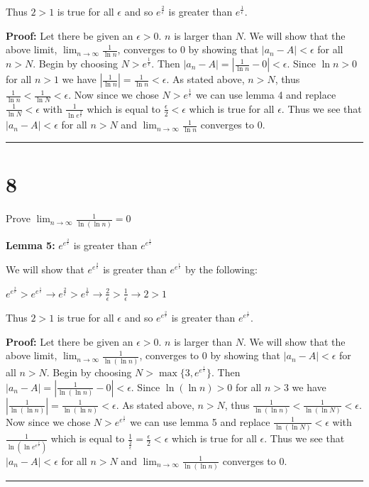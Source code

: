 \documentclass[12pt]{article}
\newcommand{\imp}{\rightarrow}
\newcommand\qedsym{\hfill \rule{2mm}{2mm}}
\begin{document}
Thus $2 > 1$ is true for all $\epsilon$ and so $e^{\frac{2}{\epsilon}}$ is greater than $e^{\frac{1}{\epsilon}}$.

\bigskip

\textbf{Proof:} Let there be given an $\epsilon > 0$. $n$ is larger than $N$. We will show that the above limit, $\lim_{n\to \infty}\frac{1}{\ln n}$, converges to $0$ by showing that $|a_n - A| < \epsilon$ for all $n > N$. Begin by choosing $N > e^{\frac{1}{\epsilon}}$. Then $|a_n - A| = | \frac{1}{\ln n} - 0 | < \epsilon$. Since $\ln n > 0$ for all $n > 1$ we have $|\frac{1}{\ln n}| = \frac{1}{\ln n} < \epsilon$. As stated above, $n > N$, thus $\frac{1}{\ln n} < \frac{1}{\ln N} < \epsilon$. Now since we chose $N > e^\frac{1}{\epsilon}$ we can use lemma 4 and replace $\frac{1}{\ln N} < \epsilon$ with $\frac{1}{\ln e^\frac{2}{\epsilon}}$ which is equal to $\frac{\epsilon}{2} < \epsilon$ which is true for all $\epsilon$. Thus we see that $|a_n - A| < \epsilon$ for all $n > N$ and $\lim_{n\to \infty}\frac{1}{\ln n}$ converges to $0$.
\qedsym{}

\section*{8}
Prove $\lim_{n\to \infty}\frac{1}{\ln(\ln n)} = 0$

\bigskip

\textbf{Lemma 5:} $e^{e^{\frac{2}{\epsilon}}}$ is greater than $e^{e^{\frac{1}{\epsilon}}}$

We will show that $e^{e^{\frac{2}{\epsilon}}}$ is greater than $e^{e^{\frac{1}{\epsilon}}}$ by the following:

$e^{e^{\frac{2}{\epsilon}}} > e^{e^{\frac{1}{\epsilon}}}
  \imp e^{\frac{2}{\epsilon}} > e^{\frac{1}{\epsilon}}
  \imp \frac{2}{\epsilon} > \frac{1}{\epsilon}
  \imp 2 > 1$

Thus $2 > 1$ is true for all $\epsilon$ and so $e^{e^{\frac{2}{\epsilon}}}$ is greater than $e^{e^{\frac{1}{\epsilon}}}$.

\bigskip

\textbf{Proof:} Let there be given an $\epsilon > 0$. $n$ is larger than $N$. We will show that the above limit, $\lim_{n\to \infty}\frac{1}{\ln(\ln n)}$, converges to $0$ by showing that $|a_n - A| < \epsilon$ for all $n > N$. Begin by choosing $N > \max\{3, e^{e^{\frac{1}{\epsilon}}}\}$. Then $|a_n - A| = | \frac{1}{\ln(\ln n)} - 0 | < \epsilon$. Since $\ln(\ln n) > 0$ for all $n > 3$ we have $|\frac{1}{\ln(\ln n)}| = \frac{1}{\ln(\ln n)} < \epsilon$. As stated above, $n > N$, thus $\frac{1}{\ln(\ln n)} < \frac{1}{\ln(\ln N)} < \epsilon$. Now since we chose $N > e^{e^\frac{1}{\epsilon}}$ we can use lemma 5 and replace $\frac{1}{\ln(\ln N)} < \epsilon$ with $\frac{1}{\ln(\ln e^{e^\frac{2}{\epsilon}})}$ which is equal to $\frac{1}{\frac{2}{\epsilon}} = \frac{\epsilon}{2} < \epsilon$ which is true for all $\epsilon$. Thus we see that $|a_n - A| < \epsilon$ for all $n > N$ and $\lim_{n\to \infty}\frac{1}{\ln(\ln n)}$ converges to $0$.
\qedsym{}
\end{document}
